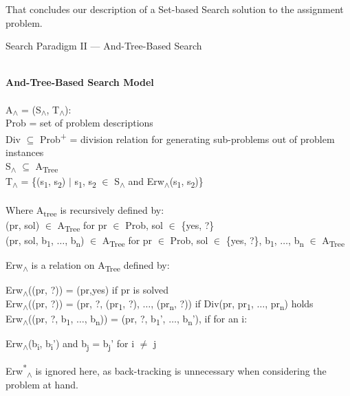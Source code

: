 \documentclass[11pt, oneside]{article}   	%
\begin{document}
\noindent That concludes our description of a Set-based Search solution to the assignment problem.

\newpage

\centerline{{\Large Search Paradigm II --- And-Tree-Based Search}}
\noindent \textbf{\\And-Tree-Based Search Model}\\\\
A\textsubscript{$\land$} = (S\textsubscript{$\land$}, T\textsubscript{$\land$}):\\
\indent Prob = set of problem descriptions\\
\indent Div $\subseteq$ Prob\textsuperscript{+} = division relation for generating sub-problems out of problem instances\\
\indent S\textsubscript{$\land$} $\subseteq$ A\textsubscript{Tree}\\
\indent T\textsubscript{$\land$} = \{(s\textsubscript{1}, s\textsubscript{2}) $\vert$ s\textsubscript{1}, s\textsubscript{2} $\in$ S\textsubscript{$\land$} and Erw\textsubscript{$\land$}(s\textsubscript{1}, s\textsubscript{2})\}\\\\
Where A\textsubscript{tree} is recursively defined by:\\
\indent (pr, sol) $\in$ A\textsubscript{Tree} for pr $\in$ Prob, sol $\in$ \{yes, ?\}\\
\indent (pr, sol, b\textsubscript{1}, $\ldots$, b\textsubscript{n}) $\in$ A\textsubscript{Tree} for pr $\in$ Prob, sol $\in$ \{yes, ?\}, b\textsubscript{1}, $\ldots$, b\textsubscript{n} $\in$ A\textsubscript{Tree}

\noindent Erw\textsubscript{$\land$} is a relation on A\textsubscript{Tree} defined by:

\indent Erw\textsubscript{$\land$}((pr, ?)) = (pr,yes) if pr is solved\\
\indent Erw\textsubscript{$\land$}((pr, ?)) = (pr, ?, (pr\textsubscript{1}, ?), $\ldots$, (pr\textsubscript{n}, ?)) if Div(pr, pr\textsubscript{1}, $\ldots$, pr\textsubscript{n}) holds\\
\indent Erw\textsubscript{$\land$}((pr, ?, b\textsubscript{1}, $\ldots$, b\textsubscript{n})) = (pr, ?, b\textsubscript{1}', $\ldots$, b\textsubscript{n}'), if for an i:\\
\centerline{Erw\textsubscript{$\land$}(b\textsubscript{i}, b\textsubscript{i}') and b\textsubscript{j} = b\textsubscript{j}' for i $\neq$ j}

\noindent Erw\textsuperscript{*}\textsubscript{$\land$} is ignored here, as back-tracking is unnecessary when considering the problem at hand.\\
\end{document}
